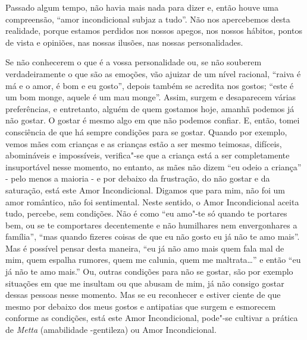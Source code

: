 Passado algum tempo, não havia mais nada para dizer e, então houve uma
compreensão, ``amor incondicional subjaz a tudo''. Não nos apercebemos
desta realidade, porque estamos perdidos nos nossos apegos, nos nossos
hábitos, pontos de vista e opiniões, nas nossas ilusões, nas nossas
personalidades.

Se não conhecerem o que é a vossa personalidade ou, se não souberem
verdadeiramente o que são as emoções, vão ajuizar de um nível racional,
``raiva é má e o amor, é bom e eu gosto'', depois também se acredita nos
gostos; ``este é um bom monge, aquele é um mau monge''. Assim, surgem e
desaparecem várias preferências, e entretanto, alguém de quem gostamos
hoje, amanhã podemos já não gostar. O gostar é mesmo algo em que não
podemos confiar. E, então, tomei consciência de que há sempre condições
para se gostar. Quando por exemplo, vemos mães com crianças e as
crianças estão a ser mesmo teimosas, difíceis, abomináveis e
impossíveis, verifica"-se que a criança está a ser completamente
insuportável nesse momento, no entanto, as mães não dizem ``eu odeio a
criança'' - pelo menos a maioria - e por debaixo da frustração, do não
gostar e da saturação, está este Amor Incondicional. Digamos que para
mim, não foi um amor romântico, não foi sentimental. Neste sentido, o
Amor Incondicional aceita tudo, percebe, sem condições. Não é como ``eu
amo"-te só quando te portares bem, ou se te comportares decentemente e
não humilhares nem envergonhares a família'', ``mas quando fizeres
coisas de que eu não gosto eu já não te amo mais''. Mas é possível
pensar desta maneira, ``eu já não amo mais quem fala mal de mim, quem
espalha rumores, quem me calunia, quem me maltrata\ldots{}'' e então ``eu já
não te amo mais.'' Ou, outras condições para não se gostar, são por
exemplo situações em que me insultam ou que abusam de mim, já não
consigo gostar dessas pessoas nesse momento. Mas se eu reconhecer e
estiver ciente de que mesmo por debaixo dos meus gostos e antipatias que
surgem e esmorecem conforme as condições, está este Amor Incondicional,
pode"-se cultivar a prática de \emph{Metta} (amabilidade -gentileza) ou
Amor Incondicional.

